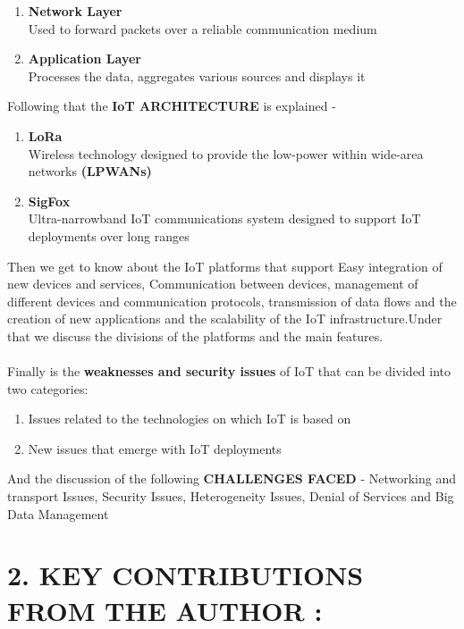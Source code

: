 \documentclass{report}
\begin{document}
{\begin{enumerate}
        \item \textbf{Network Layer}\\ Used to forward packets over a reliable communication medium
        \item \textbf{Application Layer}\\ Processes the data, aggregates various sources and displays it
    \end{enumerate}
    Following that the \textbf{IoT ARCHITECTURE} is explained -
    \begin{enumerate}
        \item \textbf{LoRa}\\ Wireless technology designed to provide the low-power within wide-area networks \textbf{(LPWANs)}
        \item \textbf{SigFox}\\ Ultra-narrowband IoT communications system designed to support IoT deployments over long ranges
    \end{enumerate}
    Then we get to know about the IoT platforms that support Easy integration of new devices and services, Communication between devices, management of different devices and communication protocols, transmission of data flows and the creation of new applications and the scalability of the IoT infrastructure.Under that we discuss the divisions of the platforms and the main features.\\\\
    Finally is the \textbf{weaknesses and security issues} of IoT that can be divided into two categories: 
    \begin{enumerate}
        \item Issues related to the technologies on which IoT is based on
        \item New issues that emerge with IoT deployments
    \end{enumerate}
    And the discussion of the following \textbf{CHALLENGES FACED} - Networking and transport Issues, Security Issues, Heterogeneity Issues, Denial of Services and Big Data Management\\}
    
    \section*{2. KEY CONTRIBUTIONS FROM THE AUTHOR :}
    
\end{document}
